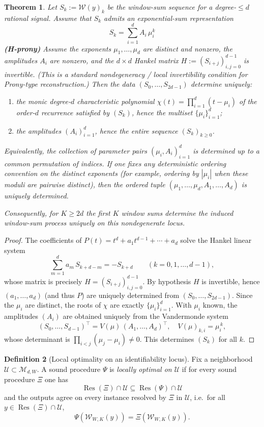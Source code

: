\documentclass[11pt,reqno]{amsart}
\newtheorem{theorem}{Theorem}[section]
\theoremstyle{definition}
\newtheorem{definition}[theorem]{Definition}
\theoremstyle{remark}
\newcommand{\1}{\mathbf{1}}
\begin{document}
\begin{theorem}\label{thm:window-ident-global}
Let $S_k:=\mathcal W(y)_k$ be the window-sum sequence for a degree-$\le d$ rational signal.
Assume that $S_k$ admits an exponential-sum representation
\[
S_k=\sum_{i=1}^d A_i\,\mu_i^k
\]
\noindent\textbf{(H-prony)}\; Assume the exponents $\mu_1,\dots,\mu_d$ are distinct and nonzero, the amplitudes $A_i$ are nonzero, and the $d\times d$ Hankel matrix $H:=(S_{i+j})_{i,j=0}^{d-1}$ is invertible. (This is a standard nondegeneracy / local invertibility condition for Prony-type reconstruction.)
Then the data $(S_0,\dots,S_{2d-1})$ determine uniquely:
\begin{enumerate}
\item the monic degree-$d$ characteristic polynomial $\chi(t)=\prod_{i=1}^d(t-\mu_i)$ of the order-$d$ recurrence satisfied by $(S_k)$, hence the multiset $\{\mu_i\}_{i=1}^d$;
\item the amplitudes $(A_i)_{i=1}^d$, hence the entire sequence $(S_k)_{k\ge 0}$.
\end{enumerate}
Equivalently, the collection of parameter pairs $(\mu_i,A_i)_{i=1}^d$ is determined up to a common permutation of indices. If one fixes any deterministic ordering convention on the distinct exponents (for example, ordering by $|\mu_i|$ when these moduli are pairwise distinct), then the ordered tuple $(\mu_1,\dots,\mu_d,A_1,\dots,A_d)$ is uniquely determined.

Consequently, for $K\ge 2d$ the first $K$ window sums determine the induced window-sum process uniquely on this nondegenerate locus.
\end{theorem}

\begin{proof}
The coefficients of $P(t)=t^d+a_1 t^{d-1}+\cdots+a_d$ solve the Hankel linear system
\[
\sum_{m=1}^d a_m\,S_{k+d-m}=-S_{k+d}\qquad (k=0,1,\dots,d-1),
\]
whose matrix is precisely $H=(S_{i+j})_{i,j=0}^{d-1}$. By hypothesis $H$ is invertible, hence
$(a_1,\dots,a_d)$ (and thus $P$) are uniquely determined from $(S_0,\dots,S_{2d-1})$.
Since the $\mu_i$ are distinct, the roots of $\chi$ are exactly $\{\mu_i\}_{i=1}^d$.
With $\mu_i$ known, the amplitudes $(A_i)$ are obtained uniquely from the Vandermonde system
\[
(S_0,\dots,S_{d-1})^\top = V(\mu)\,(A_1,\dots,A_d)^\top,
\quad V(\mu)_{k,i}=\mu_i^{\,k},
\]
whose determinant is $\prod_{i<j}(\mu_j-\mu_i)\neq 0$. This determines $(S_k)$ for all $k$.
\end{proof}


\begin{definition}[Local optimality on an identifiability locus]\label{def:local-optimal}
Fix a neighborhood $\mathcal{U}\subset\mathcal{M}_{d,W}$.
A sound procedure $\Psi$ is \emph{locally optimal on $\mathcal{U}$} if for every sound procedure $\Xi$ one has
\[
\operatorname{Res}(\Xi)\cap\mathcal{U}\subseteq \operatorname{Res}(\Psi)\cap\mathcal{U}
\]
and the outputs agree on every instance resolved by $\Xi$ in $\mathcal{U}$, i.e.\ for all $y\in \operatorname{Res}(\Xi)\cap\mathcal{U}$,
\[
\Psi(\mathcal{W}_{W,K}(y))=\Xi(\mathcal{W}_{W,K}(y)).
\]
\end{definition}
\end{document}
